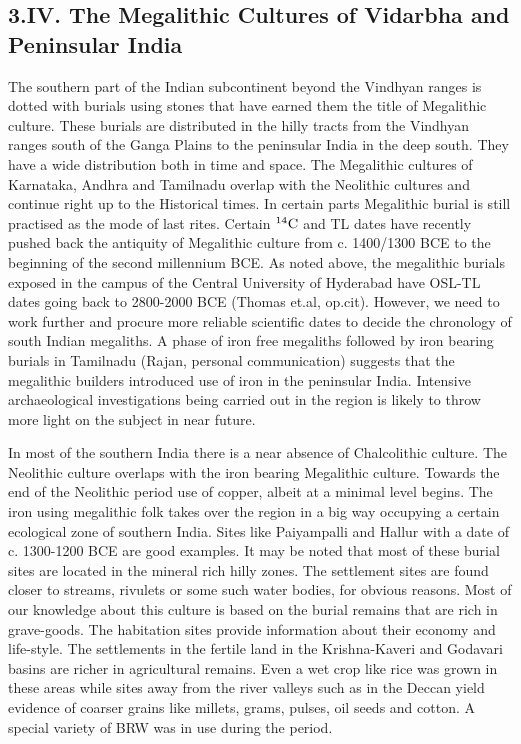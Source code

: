 \subsection*{3.IV. The Megalithic Cultures of Vidarbha and Peninsular India}\label{subsection-11}

The southern part of the Indian subcontinent beyond the Vindhyan ranges is dotted with burials using stones that have earned them the title of Megalithic culture. These burials are distributed in the hilly tracts from the Vindhyan ranges south of the Ganga Plains to the peninsular India in the deep south. They have a wide distribution both in time and space. The Megalithic cultures of Karnataka, Andhra and Tamilnadu overlap with the Neolithic cultures and continue right up to the Historical times. In certain parts Megalithic burial is still practised as the mode of last rites. Certain $^{14}{\rm C}$ and TL dates have recently pushed back the antiquity of Megalithic culture from c. 1400/1300 BCE to the beginning of the second millennium BCE. As noted above, the megalithic burials exposed in the campus of the Central University of Hyderabad have OSL-TL dates going back to 2800-2000 BCE (Thomas et.al, op.cit). However, we need to work further and procure more reliable scientific dates to decide the chronology of south Indian megaliths. A phase of iron free megaliths followed by iron bearing burials in Tamilnadu (Rajan, personal communication) suggests that the megalithic builders introduced use of iron in the peninsular India. Intensive archaeological investigations being carried out in the region is likely to throw more light on the subject in near future.

In most of the southern India there is a near absence of Chalcolithic culture. The Neolithic culture overlaps with the iron bearing Megalithic culture. Towards the end of the Neolithic period use of copper, albeit at a minimal level begins. The iron using megalithic folk takes over the region in a big way occupying a certain ecological zone of southern India. Sites like Paiyampalli and Hallur with a date of c. 1300-1200 BCE are good examples. It may be noted that most of these burial sites are located in the mineral rich hilly zones. The settlement sites are found closer to streams, rivulets or some such water bodies, for obvious reasons. Most of our knowledge about this culture is based on the burial remains that are rich in grave-goods. The habitation sites provide information about their economy and life-style. The settlements in the fertile land in the Krishna-Kaveri and Godavari basins are richer in agricultural remains. Even a wet crop like rice was grown in these areas while sites away from the river valleys such as in the Deccan yield evidence of coarser grains like millets, grams, pulses, oil seeds and cotton. A special variety of BRW was in use during the period. 

